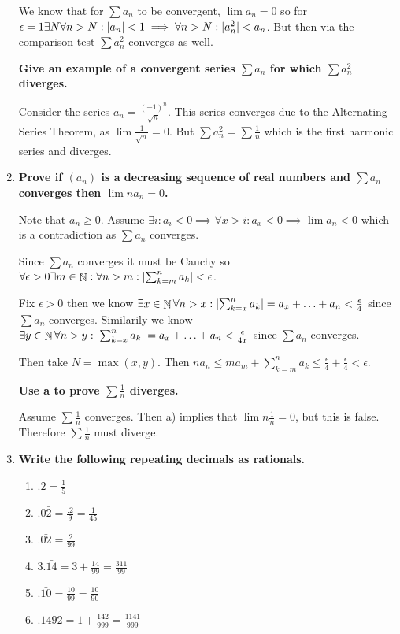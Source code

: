 \documentclass[10pt,a4paper]{article}
\DeclareMathOperator*{\N}{\mathbb{N}}
\DeclarePairedDelimiter{\abs}{\lvert}{\rvert}
\begin{document}
\begin{enumerate}
        We know that for $\sum a_n$ to be convergent, $\lim a_n = 0$ so for $\epsilon = 1 \exists N \forall n > N : \abs{a_n} < 1 \implies \forall n > N: \abs{a_n^2} < a_n$.  But then via the comparison test $\sum a_n^2$ converges as well.
            
        \textbf{Give an example of a convergent series $\sum a_n$ for which $\sum a_n^2$ diverges.}

        Consider the series $a_n = \frac{(-1)^n}{\sqrt n }$. This series converges due to the Alternating Series Theorem, as $\lim \frac{1}{\sqrt n } = 0$. 
        But $\sum a_n^2 = \sum \frac{1}{n}$ which is the first harmonic series and diverges.

    \item \textbf{Prove if $(a_n)$ is a decreasing sequence of real numbers and $\sum a_n$ converges then $\lim n a_n = 0$.}

        Note that $a_n \geq 0$. Assume $\exists i : a_i < 0 \implies \forall x > i: a_x < 0 \implies \lim a_n < 0$ which is a contradiction as $\sum a_n$ converges.

        Since $\sum a_n$ converges it must be Cauchy so $\forall \epsilon > 0 \exists m \in \N: \forall n > m: \abs{\sum_{k=m}^n a_k} < \epsilon$.

        Fix $\epsilon > 0$ then we know  $\exists x \in \N \forall n > x: \abs{\sum_{k=x}^n a_k} = a_x + \ldots + a_n < \frac{\epsilon}{4}$ since $\sum a_n$ converges.
        Similarily we know $\exists y \in \N \forall n > y: \abs{\sum_{k=x}^n a_k} = a_x + \ldots + a_n < \frac{\epsilon}{4x}$ since $\sum a_n$ converges.

        Then take $N = \max(x , y)$. Then $n a_n \leq m a_m + \sum_{k=m}^n a_k \leq \frac{\epsilon}{4} + \frac{\epsilon}{4} < \epsilon$.

        \textbf{ Use a to prove $\sum \frac{1}{n}$ diverges.}

        Assume $\sum \frac{1}{n}$ converges. Then a) implies that $\lim n \frac{1}{n} = 0$, but this is false. Therefore $\sum \frac{1}{n}$ must diverge.

    \item \textbf{ Write the following repeating decimals as rationals.}

        \begin{enumerate}
            \item $.2  = \frac{1}{5}$
            \item $.0\bar{2}  = \frac{.2}{9} = \frac{1}{45}$
            \item $.\bar{02}  = \frac{2}{99}$
            \item $3.\bar{14}  = 3 + \frac{14}{99} = \frac{311}{99}$
            \item $.\bar{10}  = \frac{10}{99} = \frac{10}{90}$
            \item $.1\bar{492}  = 1+ \frac{142}{999} = \frac{1141}{999}$
        \end{enumerate}


\end{enumerate}
\end{document}
